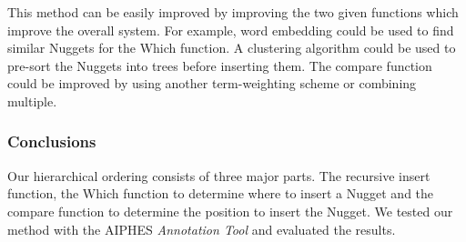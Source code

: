 This method can be easily improved by improving the two given functions which improve the overall system. For example, word embedding could be used to find similar Nuggets for the Which function. A clustering algorithm could be used to pre-sort the Nuggets into trees before inserting them. The compare function could be improved by using another term-weighting scheme or combining multiple.



\subsubsection{Conclusions}

Our hierarchical ordering consists of three major parts. The recursive insert function, the Which function to determine where to insert a Nugget and the compare function to determine the position to insert the Nugget. We tested our method with the AIPHES \textit{Annotation Tool} and evaluated the results.



